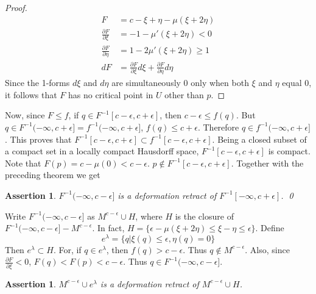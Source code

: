 \documentclass[a4paper,11pt,reqno]{amsart}
\newtheorem{asser}[thm]{Assertion}
\begin{document}
\begin{proof}
  \begin{equation}
    \nonumber
    \begin{aligned}
      F &= c - \xi + \eta - \mu(\xi+2\eta) \\
      \frac{\partial F}{\partial \xi} &= -1 - \mu'(\xi+2\eta) < 0 \\
      \frac{\partial F}{\partial \eta} &= 1 - 2\mu'(\xi+2\eta) \ge 1 \\
      dF &= \frac{\partial F}{\partial \xi}d\xi+\frac{\partial F}{\partial
        \eta}d\eta
    \end{aligned}
  \end{equation}
  Since the 1-forms $d\xi$ and $d\eta$ are simultaneously 0 only when both
  $\xi$ and $\eta$ equal 0, it follows that $F$ has no critical point in $U$
  other than $p$.
\end{proof}

Now, since $F \le f$, if $q \in F^{-1}[c-\epsilon, c+\epsilon]$, then
$c-\epsilon \le f(q)$. But $q \in F^{-1}(-\infty, c+\epsilon] = f^{-1}(-\infty,
c+\epsilon]$, $f(q) \le c+ \epsilon$. Therefore $q \in f^{-1}(-\infty,
c+\epsilon]$. This proves that $F^{-1}[c-\epsilon, c+\epsilon] \subset
f^{-1}[c-\epsilon, c+\epsilon]$. Being a closed subset of a compact set in a
locally compact Hausdorff space, $F^{-1}[c-\epsilon, c+\epsilon]$ is compact.
Note that $F(p) = c- \mu(0) < c-\epsilon$. $p \notin F^{-1}[c-\epsilon,
c+\epsilon]$. Together with the preceding theorem we get

\begin{asser}
  $F^{-1}(-\infty, c-\epsilon]$ is a deformation retract of $F^{-1}[-\infty,
  c+\epsilon]$. \qed
\end{asser}

Write $F^{-1}(-\infty, c-\epsilon]$ as $M^{c-\epsilon}\cup H$, where $H$ is the
closure of $F^{-1}(-\infty, c-\epsilon] - M^{c-\epsilon}$. In fact, $H = \{
\epsilon-\mu(\xi+2\eta) \le \xi-\eta \le \epsilon \}$. Define
\begin{equation}
  e^\lambda = \{ q | \xi(q) \le \epsilon, \eta(q) = 0\}
\end{equation}
Then $e^\lambda \subset H$. For, if $q \in e^\lambda$, then $f(q) >
c-\epsilon$. Thus $q \notin M^{c-\epsilon}$. Also, since $\frac{\partial
  F}{\partial \xi} < 0$, $F(q) < F(p) < c-\epsilon$. Thus $q \in F^{-1}(-\infty,
c-\epsilon]$.

\begin{asser}
  $M^{c-\epsilon} \cup e^\lambda$ is a deformation retract of
  $M^{c-\epsilon}\cup H$.
\end{asser}
\end{document}
